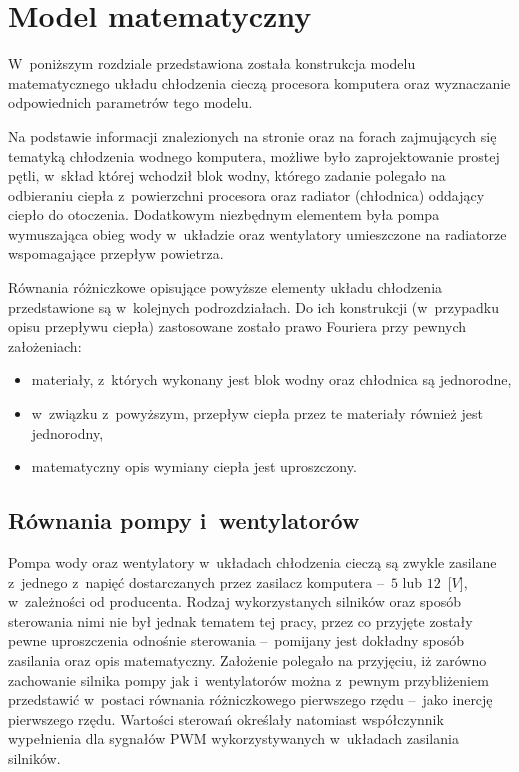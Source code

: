 \section{Model matematyczny}
\indent

W~poniższym rozdziale przedstawiona została konstrukcja modelu matematycznego
układu chłodzenia cieczą procesora komputera oraz wyznaczanie odpowiednich
parametrów tego modelu.

Na podstawie informacji znalezionych na stronie \cite{EKWBsite} oraz na forach
zajmujących się tematyką chłodzenia wodnego komputera, możliwe było
zaprojektowanie prostej pętli, w~skład której wchodził blok wodny, którego
zadanie polegało na odbieraniu ciepła z~powierzchni procesora oraz radiator
(chłodnica) oddający ciepło do otoczenia. Dodatkowym niezbędnym elementem była
pompa wymuszająca obieg wody w~układzie oraz wentylatory umieszczone na
radiatorze wspomagające przepływ powietrza.

Równania różniczkowe opisujące powyższe elementy układu chłodzenia przedstawione
są w~kolejnych podrozdziałach. Do ich konstrukcji (w~przypadku opisu przepływu
ciepła) zastosowane zostało prawo Fouriera przy pewnych założeniach:
\begin{itemize}
    \item materiały, z~których wykonany jest blok wodny oraz chłodnica są
    jednorodne,
    \item w~związku z~powyższym, przepływ ciepła przez te materiały również jest
    jednorodny,
    \item matematyczny opis wymiany ciepła jest uproszczony.
\end{itemize}

\subsection{Równania pompy i~wentylatorów}
\indent

Pompa wody oraz wentylatory w~układach chłodzenia cieczą są zwykle zasilane
z~jednego z~napięć dostarczanych przez zasilacz komputera --~$5$ lub $12$~[$V$],
w~zależności od producenta. Rodzaj wykorzystanych silników oraz sposób
sterowania nimi nie był jednak tematem tej pracy, przez co przyjęte zostały
pewne uproszczenia odnośnie sterowania --~pomijany jest dokładny sposób
zasilania oraz opis matematyczny. Założenie polegało na przyjęciu, iż zarówno
zachowanie silnika pompy jak i~wentylatorów można z~pewnym przybliżeniem
przedstawić w~postaci równania różniczkowego pierwszego rzędu --~jako inercję
pierwszego rzędu. Wartości sterowań określały natomiast współczynnik
wypełnienia dla sygnałów PWM wykorzystywanych w~układach zasilania silników.

